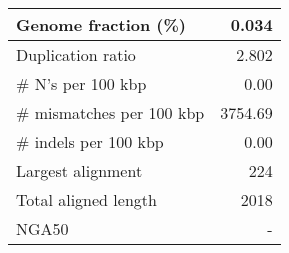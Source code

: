 \documentclass[12pt,a4paper]{article}
\begin{document}
\begin{table}[ht]
\begin{center}
\begin{tabular}{|l*{1}{|r}|}
Genome fraction (\%) & 0.034 \\ \hline
Duplication ratio & 2.802 \\ \hline
\# N's per 100 kbp & 0.00 \\ \hline
\# mismatches per 100 kbp & 3754.69 \\ \hline
\# indels per 100 kbp & 0.00 \\ \hline
Largest alignment & 224 \\ \hline
Total aligned length & 2018 \\ \hline
NGA50 & - \\ \hline
\end{tabular}
\end{center}
\end{table}
\end{document}
